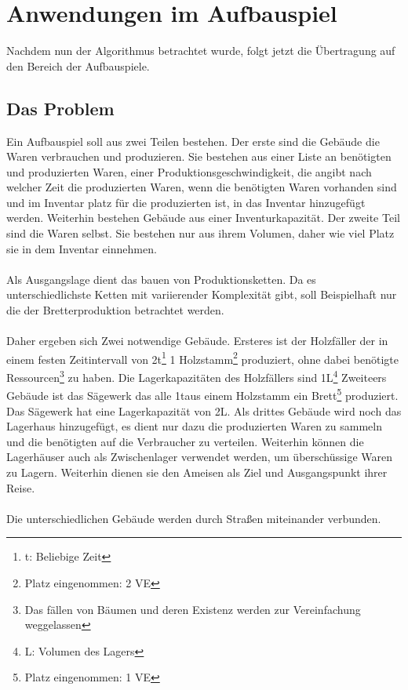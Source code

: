 \documentclass[12pt]{article}
\begin{document}
\section{Anwendungen im Aufbauspiel}
Nachdem nun der Algorithmus betrachtet wurde, folgt jetzt die Übertragung auf den Bereich der Aufbauspiele.

\subsection{Das Problem}
Ein Aufbauspiel soll aus zwei Teilen bestehen. Der erste sind die Gebäude die Waren verbrauchen und produzieren. Sie bestehen aus einer Liste an benötigten und produzierten Waren, einer Produktionsgeschwindigkeit, die angibt nach welcher Zeit die produzierten Waren, wenn die benötigten Waren vorhanden sind und im Inventar platz für die produzierten ist, in das Inventar hinzugefügt werden. Weiterhin bestehen Gebäude aus einer Inventurkapazität.
Der zweite Teil sind die Waren selbst. Sie bestehen nur aus ihrem Volumen, daher wie viel Platz sie in dem Inventar einnehmen.\\\\
Als Ausgangslage dient das bauen von Produktionsketten. Da es unterschiedlichste Ketten mit variierender Komplexität gibt, soll Beispielhaft nur die der Bretterproduktion betrachtet werden.\\\\
Daher ergeben sich Zwei notwendige Gebäude. Ersteres ist der Holzfäller der in einem festen Zeitintervall von 2t\footnote{t: Beliebige Zeit} 1 Holzstamm\footnote{Platz eingenommen: 2 VE} produziert, ohne dabei benötigte Ressourcen\footnote{Das fällen von Bäumen und deren Existenz werden zur Vereinfachung weggelassen} zu haben. Die Lagerkapazitäten des Holzfällers sind 1L\footnote{L: Volumen des Lagers} Zweiteers Gebäude ist das Sägewerk das alle 1t\footnotemark[3] aus einem Holzstamm ein Brett\footnote{Platz eingenommen: 1 VE} produziert. Das Sägewerk hat eine Lagerkapazität von 2L\footnotemark[6]. 
Als drittes Gebäude wird noch das Lagerhaus hinzugefügt, es dient nur dazu die produzierten Waren zu sammeln und die benötigten auf die Verbraucher zu verteilen. Weiterhin können die Lagerhäuser auch als Zwischenlager verwendet werden, um überschüssige Waren zu Lagern. Weiterhin dienen sie den Ameisen als Ziel und Ausgangspunkt ihrer Reise.\\\\
Die unterschiedlichen Gebäude werden durch Straßen miteinander verbunden.
\end{document}

